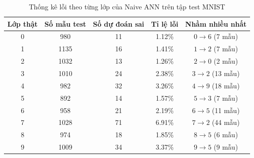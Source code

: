 \begin{table}[H]
\centering
\caption{Thống kê lỗi theo từng lớp của Naive ANN trên tập test MNIST}
\label{tab:mnist-naive-error-by-class}
\small
\begin{tabular}{c c c c c}
\toprule
Lớp thật & Số mẫu test & Số dự đoán sai & Tỉ lệ lỗi & Nhầm nhiều nhất \\
\midrule
0 & 980 & 11 & 1.12\% & $0 \rightarrow 6$ (7 mẫu) \\
1 & 1135 & 16 & 1.41\% & $1 \rightarrow 2$ (7 mẫu) \\
2 & 1032 & 13 & 1.26\% & $2 \rightarrow 0$ (2 mẫu) \\
3 & 1010 & 24 & 2.38\% & $3 \rightarrow 2$ (13 mẫu) \\
4 & 982 & 32 & 3.26\% & $4 \rightarrow 9$ (18 mẫu) \\
5 & 892 & 14 & 1.57\% & $5 \rightarrow 3$ (7 mẫu) \\
6 & 958 & 21 & 2.19\% & $6 \rightarrow 5$ (11 mẫu) \\
7 & 1028 & 71 & 6.91\% & $7 \rightarrow 2$ (44 mẫu) \\
8 & 974 & 18 & 1.85\% & $8 \rightarrow 5$ (6 mẫu) \\
9 & 1009 & 34 & 3.37\% & $9 \rightarrow 5$ (9 mẫu) \\
\bottomrule
\end{tabular}
\end{table}
